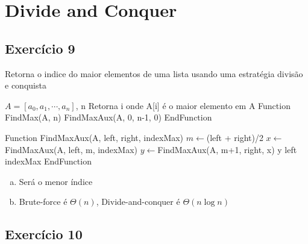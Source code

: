 
\newpage

\section{Divide and Conquer}\label{sec:divide_and_conquer}

\subsection{Exercício 9}\label{sec:exer9}

\begin{algorithm}
  \caption{Retorna o indice do maior elementos de uma lista usando uma estratégia divisão e conquista}
  \begin{algorithmic}
    \REQUIRE $A=[a_{0}, a_{1}, \cdots, a_{n}]$, n
    \ENSURE Retorna i onde A[i] é o maior elemento em A
    \STATE Function FindMax(A, n)
      \RETURN FindMaxAux(A, 0, n-1, 0)
    \STATE EndFunction
    
    \STATE Function FindMaxAux(A, left, right, indexMax)
        \STATE $m \leftarrow $(left + right)/2
        \STATE $x \leftarrow $FindMaxAux(A, left, m, indexMax)
        \STATE $y \leftarrow $FindMaxAux(A, m+1, right, x)
        \RETURN y
      \ELSE
          \RETURN left
        \ELSE
          \RETURN indexMax
        \ENDIF
      \ENDIF
    \STATE EndFunction
  \end{algorithmic}
\end{algorithm}

\begin{enumerate}[a)]
  \item Será o menor índice
  \item Brute-force é $\Theta(n)$, Divide-and-conquer é $\Theta(n\log{}n)$
\end{enumerate}

\newpage
\subsection{Exercício 10}\label{sec:exer10}

